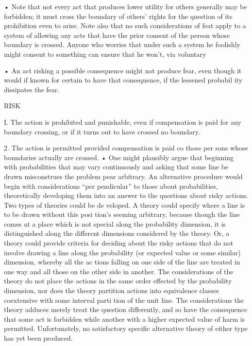 \documentclass[11pt,openany]{book}
\begin{document}
{• Note that not every act that produces lower utility for others generally may be forbidden; it must cross the boundary of others' rights for the question of its prohibition even to arise. Note also that no such considerations of feat apply to a system of allowing any acts that have the prior consent of the person whose boundary is crossed. Anyone who worries that under such a system he foolishly might consent to something can ensure that he won't, via voluntary\par

• An act risking a possible consequence might not produce fear, even though it would if known for certain to have that consequence, if the lessened probabil ity dissipates the fear.\par

RISK\par

I. The action is prohibited and punishable, even if compensation is paid for any boundary crossing, or if it turns out to have crossed no boundary.\par

2. The action is permitted provided compensation is paid co those per sons whose boundaries actually are crossed. • One might plausibly argue that beginning with probabilities that may vary continuously and asking that some line be drawn misconstrues the problem pear arbitrary. An alternative procedure would begin with considerations ``per pendicular'' to those about probabilities, theoretically developing them into an answer to the questions about risky actions. Two types of theories could be de veloped. A theory could specify where a line is to be drawn without this posi tion's seeming arbitrary, because though the line comes at a place which is not special along the probability dimension, it is distinguished along the different dimensions considered by the theory. Or, a theory could provide criteria for deciding about the risky actions that do not involve drawing a line along the probability (or expected value or some similar) dimension, whereby all the ac tions falling on one side of the line are treated in one way and all those on the other side in another. The considerations of the theory do not place the actions in the same order effected by the probability dimension, nor does the theory partition actions into equivalence classes coextensive with some interval parti tion of the unit line. The considerations the theory adduces merely treat the question differently, and so have the consequence that some act is forbidden while another with a higher expected value of harm is permitted. Unfortunately, no satisfactory specific alternative theory of either type has yet been produced.\par

}
\end{document}
